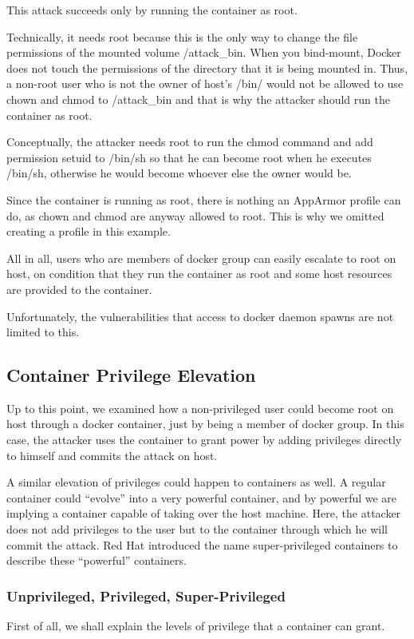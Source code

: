 This attack succeeds only by running the container as root.

Technically, it needs root because this is the only way to change the file permissions of the mounted volume /attack\_bin. When you bind-mount, Docker does not touch the permissions of the directory that it is being mounted in. Thus, a non-root user who is not the owner of host's /bin/ would not be allowed to use chown and chmod to /attack\_bin and that is why the attacker should run the container as root.

Conceptually, the attacker needs root to run the chmod command and add permission setuid to /bin/sh so that he can become root when he executes /bin/sh, otherwise he would become whoever else the owner would be.

Since the container is running as root, there is nothing an AppArmor profile can do, as chown and chmod are anyway allowed to root. This is why we omitted creating a profile in this example.

All in all, users who are members of docker group can easily escalate to root on host, on condition that they run the container as root and some host resources are provided to the container.

Unfortunately, the vulnerabilities that access to docker daemon spawns are not limited to this.

\subsection{Container Privilege Elevation}
Up to this point, we examined how a non-privileged user could become root on host through a docker container, just by being a member of docker group. In this case, the attacker uses the container to grant power by adding privileges directly to himself and commits the attack on host.

A similar elevation of privileges could happen to containers as well. A regular container could “evolve” into a very powerful container, and by powerful we are implying a container capable of taking over the host machine. Here, the attacker does not add privileges to the user but to the container through which he will commit the attack. Red Hat introduced the name super-privileged containers to describe these “powerful” containers. 

\subsubsection{Unprivileged, Privileged, Super-Privileged}
First of all, we shall explain the levels of privilege that a container can grant. 

